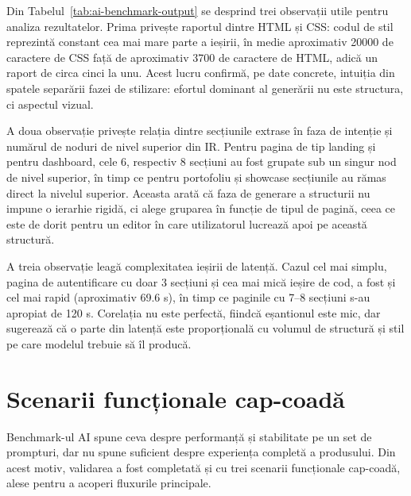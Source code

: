 Din Tabelul~\ref{tab:ai-benchmark-output} se desprind trei observații utile pentru analiza rezultatelor. Prima privește raportul dintre HTML și CSS: codul de stil reprezintă constant cea mai mare parte a ieșirii, în medie aproximativ 20000 de caractere de CSS față de aproximativ 3700 de caractere de HTML, adică un raport de circa cinci la unu. Acest lucru confirmă, pe date concrete, intuiția din spatele separării fazei de stilizare: efortul dominant al generării nu este structura, ci aspectul vizual.

A doua observație privește relația dintre secțiunile extrase în faza de intenție și numărul de noduri de nivel superior din IR. Pentru pagina de tip landing și pentru dashboard, cele 6, respectiv 8 secțiuni au fost grupate sub un singur nod de nivel superior, în timp ce pentru portofoliu și showcase secțiunile au rămas direct la nivelul superior. Aceasta arată că faza de generare a structurii nu impune o ierarhie rigidă, ci alege gruparea în funcție de tipul de pagină, ceea ce este de dorit pentru un editor în care utilizatorul lucrează apoi pe această structură.

A treia observație leagă complexitatea ieșirii de latență. Cazul cel mai simplu, pagina de autentificare cu doar 3 secțiuni și cea mai mică ieșire de cod, a fost și cel mai rapid (aproximativ 69.6 s), în timp ce paginile cu 7--8 secțiuni s-au apropiat de 120 s. Corelația nu este perfectă, fiindcă eșantionul este mic, dar sugerează că o parte din latență este proporțională cu volumul de structură și stil pe care modelul trebuie să îl producă.

\section{Scenarii funcționale cap-coadă}

Benchmark-ul AI spune ceva despre performanță și stabilitate pe un set de prompturi, dar nu spune suficient despre experiența completă a produsului. Din acest motiv, validarea a fost completată și cu trei scenarii funcționale cap-coadă, alese pentru a acoperi fluxurile principale.

